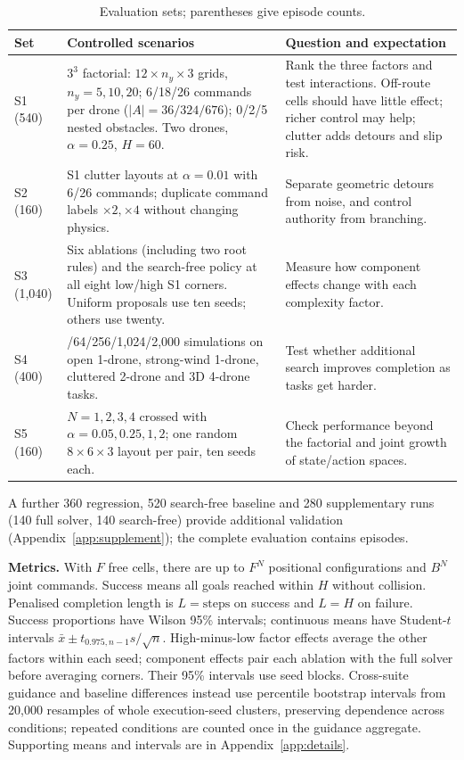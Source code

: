 \begin{table}[H]
\centering\small
\begin{tabularx}{\linewidth}{@{}>{\raggedright\arraybackslash}p{1.25cm}
>{\raggedright\arraybackslash}X>{\raggedright\arraybackslash}p{4.7cm}@{}}
\toprule Set & Controlled scenarios & Question and expectation \\
\midrule
S1 (540) &
$3^3$ factorial: $12\times n_y\times3$ grids, $n_y=5,10,20$;
6/18/26 commands per drone ($|A|=36/324/676$); 0/2/5 nested obstacles.
Two drones, $\alpha=0.25$, $H=60$. &
Rank the three factors and test interactions. Off-route cells should have
little effect; richer control may help; clutter adds detours and slip risk. \\
S2 (160) &
S1 clutter layouts at $\alpha=0.01$ with 6/26 commands;
duplicate command labels $\times2,\times4$ without changing physics. &
Separate geometric detours from noise, and control authority from branching. \\
S3 (1,040) &
Six ablations (including two root rules) and the search-free policy at all
eight low/high S1 corners. Uniform proposals use ten seeds; others use twenty. &
Measure how component effects change with each complexity factor. \\
S4 (400) &
16/64/256/1,024/2,000 simulations on open 1-drone, strong-wind 1-drone,
cluttered 2-drone and 3D 4-drone tasks. &
Test whether additional search improves completion as tasks get harder. \\
S5 (160) &
$N=1,2,3,4$ crossed with $\alpha=0.05,0.25,1,2$;
one random $8\times6\times3$ layout per pair, ten seeds each. &
Check performance beyond the factorial and joint growth of state/action spaces. \\
\bottomrule
\end{tabularx}
\caption{Evaluation sets; parentheses give episode counts.}
\end{table}

A further 360 regression, 520 search-free baseline and 280 supplementary
runs (140 full solver, 140 search-free) provide additional validation
(Appendix~\ref{app:supplement});
the complete evaluation contains  episodes.

\textbf{Metrics.} With $F$ free cells, there are up to $F^N$ positional
configurations and $B^N$ joint commands.
Success means all goals reached within $H$ without collision.
Penalised completion length is $L=\text{steps}$ on success and $L=H$ on
failure. Success proportions have Wilson 95\% intervals; continuous means
have Student-$t$ intervals $\bar x\pm t_{0.975,n-1}s/\sqrt n$.
High-minus-low factor effects average the other factors within each seed;
component effects pair each ablation with the full solver before averaging
corners. Their 95\% intervals use seed blocks. Cross-suite guidance and
baseline differences instead use percentile bootstrap intervals from
20,000 resamples of whole execution-seed clusters, preserving dependence
across conditions; repeated conditions are counted once in the guidance
aggregate. Supporting means and
intervals are in Appendix~\ref{app:details}.

